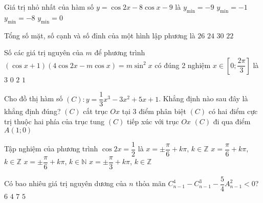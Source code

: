 \begin{ex}%
Giá trị nhỏ nhất của hàm số $y=\cos 2x -8\cos x -9$ là
\choice
{$y_{\min} = -9$}
{$y_{\min} = -1$}
{\True $y_{\min} = -8$}
{$y_{\min} = 0$}
\end{ex}

\begin{ex}%
Tổng số mặt, số cạnh và số đỉnh của một hình lập phương là
\choice
{\True $26$}
{$24$}
{$30$}
{$22$}
\end{ex}

\begin{ex}%
Số các giá trị nguyên của $m$ để phương trình $(\cos x +1)(4\cos 2x -m\cos x) =m\sin^2x$ có đúng 2 nghiệm $x \in \left [ 0; \dfrac{2\pi}{3}\right ]$ là
\choice
{$3$}
{$0$}
{\True $2$}
{$1$}
\end{ex}

\begin{ex}%
Cho đồ thị hàm số $(C) : y=\dfrac{1}{3}x^3-3x^2+5x+1$. Khẳng định nào sau đây là khẳng định đúng?
\choice
{\True $(C)$ cắt trục $Ox$ tại $3$ điểm phân biệt}
{$(C)$ có hai điểm cực trị thuộc hai phía của trục tung}
{$(C)$ tiếp xúc với trục $Ox$}
{$(C)$ đi qua điểm $A(1;0)$}
\end{ex}

\begin{ex}%
Tập nghiệm của phương trình $\cos 2x =\dfrac{1}{2}$ là
\choice
{\True $x= \pm \dfrac{\pi}{6} +k \pi$, $k \in \mathbb{Z}$}
{$x= \dfrac{\pi}{6} +k \pi$, $k \in \mathbb{Z}$}
{$x= \pm \dfrac{\pi}{6} +k \pi$, $k \in \mathbb{N}$}
{$x= \pm \dfrac{\pi}{3} +k \pi$, $k \in \mathbb{Z}$}
\end{ex}

\begin{ex}%
Có bao nhiêu giá trị nguyên dương của $n$ thỏa mãn $C_{n-1}^4 - C_{n-1}^3 -\dfrac{5}{4}A_{n-1}^2 <0$?
\choice
{\True $6$}
{$4$}
{$7$}
{$5$}
\end{ex}

